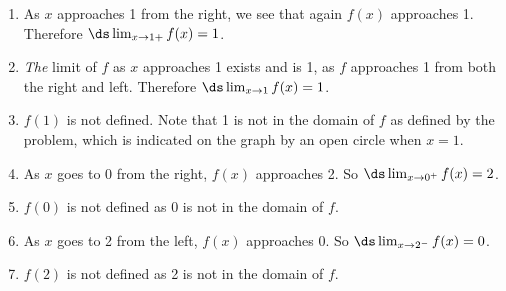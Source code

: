 \begin{example}
\begin{enumerate}
	\item	As $x$ approaches 1 from the right, we see that again $f(x)$ approaches 1. Therefore $\ds \lim_{x\to 1+} f(x)=1$.
	\item	\emph{The} limit of $f$ as $x$ approaches 1 exists and is 1, as $f$ approaches 1 from both the right and left. Therefore $\ds \lim_{x\to 1} f(x)=1$.
	\item	$f(1)$ is not defined. Note that 1 is not in the domain of $f$ as defined by the problem, which is indicated on the graph by an open circle when $x=1$.
	\item	As $x$ goes to 0 from the right, $f(x)$ approaches 2. So $\ds \lim_{x\to 0^+} f(x)=2$.
	\item	$f(0)$  is not defined as $0$ is not in the domain of $f$.
	\item	As $x$ goes to 2 from the left, $f(x)$ approaches 0. So $\ds \lim_{x\to 2^-} f(x)=0$.
	\item	$f(2)$  is not defined as 2 is not in the domain of $f$.
\end{enumerate}
\end{example}

